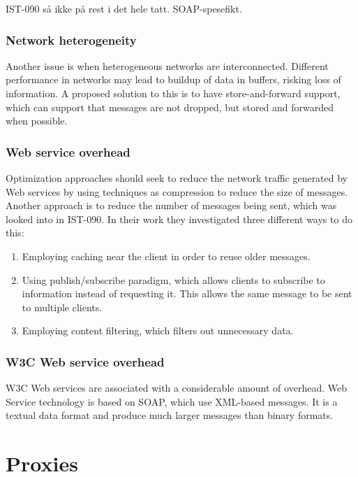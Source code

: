IST-090 så ikke på rest i det hele tatt. SOAP-spesefikt.


\subsubsection{Network heterogeneity}

Another issue is when heterogeneous networks are interconnected. Different
performance in networks may lead to buildup of data in buffers, risking loss of
information. A proposed solution to this is to have store-and-forward support,
which can support that messages are not dropped, but stored and forwarded when
possible.


\subsubsection{Web service overhead}

Optimization approaches should seek to reduce the network traffic generated by
Web services by using techniques as compression to reduce the size of messages.
Another approach is to reduce the number of messages being sent, which was
looked into in IST-090\cite{ist-090}. In their work they investigated three
different ways to do this:

\begin{enumerate}
    \item Employing caching near the client in order to reuse older messages.
    \item Using publish/subscribe paradigm, which allows clients to subscribe to
    information instead of requesting it. This allows the same message to be sent
    to multiple clients.
    \item Employing content filtering, which filters out unnecessary data.
\end{enumerate}


\subsubsection{W3C Web service overhead}
W3C Web services are associated with a considerable amount of overhead. Web
Service technology is based on SOAP, which use XML-based messages. It is a
textual data format and produce much larger messages than binary formats.


\section{Proxies}

